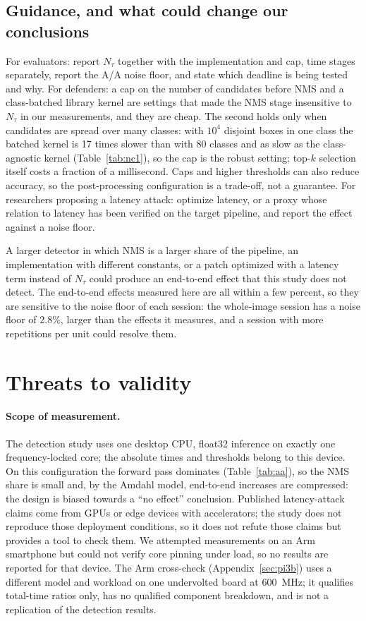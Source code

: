 \documentclass[a4paper,fleqn]{cas-dc}
\newcommand{\Ntau}{N_{\tau}}
\begin{document}
\subsection{Guidance, and what could change our conclusions}
For evaluators: report $\Ntau$ together with the implementation and cap, time stages separately, report the A/A noise floor, and state which deadline is being tested and why. For defenders: a cap on the number of candidates before NMS and a class-batched library kernel are settings that made the NMS stage insensitive to $\Ntau$ in our measurements, and they are cheap. The second holds only when candidates are spread over many classes: with $10^4$ disjoint boxes in one class the batched kernel is 17 times slower than with 80 classes and as slow as the class-agnostic kernel (Table~\ref{tab:nc1}), so the cap is the robust setting; top-$k$ selection itself costs a fraction of a millisecond. Caps and higher thresholds can also reduce accuracy, so the post-processing configuration is a trade-off, not a guarantee. For researchers proposing a latency attack: optimize latency, or a proxy whose relation to latency has been verified on the target pipeline, and report the effect against a noise floor.

A larger detector in which NMS is a larger share of the pipeline, an implementation with different constants, or a patch optimized with a latency term instead of $\Ntau$ could produce an end-to-end effect that this study does not detect. The end-to-end effects measured here are all within a few percent, so they are sensitive to the noise floor of each session: the whole-image session has a noise floor of 2.8\%, larger than the effects it measures, and a session with more repetitions per unit could resolve them.

\section{Threats to validity}
\label{sec:threats}
\paragraph{Scope of measurement.}
The detection study uses one desktop CPU, float32 inference on exactly one frequency-locked core; the absolute times and thresholds belong to this device. On this configuration the forward pass dominates (Table~\ref{tab:aa}), so the NMS share is small and, by the Amdahl model, end-to-end increases are compressed: the design is biased towards a ``no effect'' conclusion. Published latency-attack claims come from GPUs or edge devices with accelerators; the study does not reproduce those deployment conditions, so it does not refute those claims but provides a tool to check them. We attempted measurements on an Arm smartphone but could not verify core pinning under load, so no results are reported for that device. The Arm cross-check (Appendix~\ref{sec:pi3b}) uses a different model and workload on one undervolted board at 600~MHz; it qualifies total-time ratios only, has no qualified component breakdown, and is not a replication of the detection results.
\end{document}
